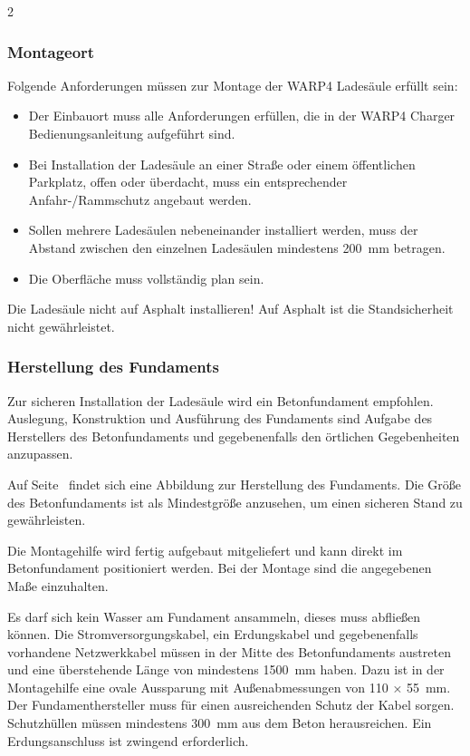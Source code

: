 \documentclass[a4paper,10pt]{article}
\newcommand{\hint}[1]{\begin{tcolorbox}[colback=boxgray,colframe=black,coltext=
white,title=Hinweis]#1\end{tcolorbox}}
\begin{document}
\begin{multicols}{2}
	\subsubsection{Montageort}
	Folgende Anforderungen müssen zur Montage der WARP4 Ladesäule erfüllt sein:
	\begin{itemize}
		\item Der Einbauort muss alle Anforderungen erfüllen, die in der
		WARP4 Charger Bedienungsanleitung aufgeführt sind.
		\item Bei Installation der Ladesäule an einer Straße oder einem
		öffentlichen Parkplatz, offen oder überdacht, muss ein entsprechender
		Anfahr-/Rammschutz angebaut werden.
		\item Sollen mehrere Ladesäulen nebeneinander installiert werden, muss
		der Abstand zwischen den einzelnen Ladesäulen mindestens \SI{200}{\milli\meter} betragen.
		\item Die Oberfläche muss vollständig plan sein.
	\end{itemize}

    \hint{Die Ladesäule nicht auf Asphalt installieren! Auf Asphalt ist die
	Standsicherheit nicht gewährleistet.}


	\subsubsection{Herstellung des Fundaments}
    Zur sicheren Installation der Ladesäule wird ein Betonfundament empfohlen.
	Auslegung, Konstruktion und Ausführung des Fundaments sind Aufgabe des
	Herstellers des Betonfundaments und gegebenenfalls den örtlichen Gegebenheiten
	anzupassen.

	Auf Seite~\pageref{appendix_base} findet sich eine
	Abbildung zur Herstellung des Fundaments. Die Größe des Betonfundaments ist als
	Mindestgröße anzusehen, um einen sicheren Stand zu gewährleisten.

	Die Montagehilfe wird fertig aufgebaut mitgeliefert und kann direkt im Betonfundament positioniert werden.
	Bei der Montage sind die angegebenen Maße einzuhalten.

	Es darf sich kein Wasser am Fundament ansammeln, dieses muss abfließen können. Die
	Stromversorgungskabel, ein Erdungskabel und gegebenenfalls vorhandene Netzwerkkabel müssen in der Mitte
	des Betonfundaments austreten und eine überstehende Länge von mindestens
	\SI{1500}{\milli\meter} haben. Dazu ist in der Montagehilfe eine
	ovale Aussparung mit Außenabmessungen von 110 × \SI{55}{\milli\meter}.
	Der Fundamenthersteller muss
	für einen ausreichenden Schutz der Kabel sorgen. Schutzhüllen müssen mindestens
	\SI{300}{\milli\meter} aus dem Beton herausreichen. Ein Erdungsanschluss ist
	zwingend erforderlich.


\end{multicols}
\end{document}
